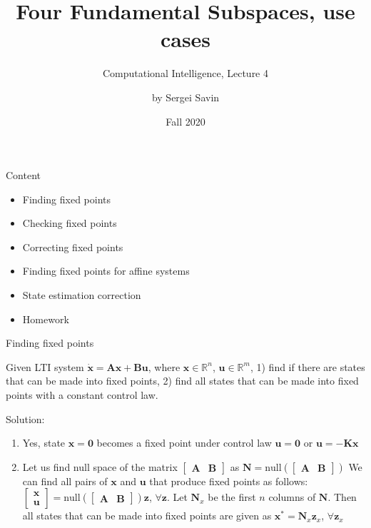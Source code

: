 \documentclass{beamer}
\title{Four Fundamental Subspaces, use cases}
\subtitle{Computational Intelligence, Lecture 4}
\author{by Sergei Savin}
\date{Fall 2020}
\begin{document}
\maketitle


\begin{frame}{Content}

\begin{itemize}
\item Finding fixed points
\item Checking fixed points
\item Correcting fixed points
\item Finding fixed points for affine systems
\item State estimation correction
\item Homework
\end{itemize}

\end{frame}



\begin{frame}{Finding fixed points}
\begin{flushleft}

Given LTI system $\dot{\mathbf{x}} = \mathbf{A} \mathbf{x} + \mathbf{B} \mathbf{u}$, where $\mathbf{x} \in \mathbb{R}^n$, $\mathbf{u} \in \mathbb{R}^m$, 1) find if there are states that can be made into fixed points, 2) find all states that can be made into fixed points with a constant control law.

\bigskip

Solution: 

\begin{enumerate}
    \item Yes, state $\mathbf{x} = \mathbf{0}$ becomes a fixed point under control law $\mathbf{u} = \mathbf{0}$ or $\mathbf{u} = -\mathbf{K}\mathbf{x}$
    \item Let us find null space of the matrix $\begin{bmatrix} \mathbf{A} & \mathbf{B} \end{bmatrix}$ as $\mathbf{N} = \text{null} (\begin{bmatrix} \mathbf{A} & \mathbf{B} \end{bmatrix})$ We can find all pairs of $\mathbf{x}$ and $\mathbf{u}$ that produce fixed points as follows: $\begin{bmatrix} \mathbf{x} \\ \mathbf{u} \end{bmatrix} = \text{null} (\begin{bmatrix} \mathbf{A} & \mathbf{B} \end{bmatrix}) \mathbf{z}$, $\forall \mathbf{z}$. Let $\mathbf{N}_x$ be the first $n$ columns of $\mathbf{N}$. Then all states that can be made into fixed points are given as $\mathbf{x}^* = \mathbf{N}_x \mathbf{z}_x$, $\forall \mathbf{z}_x$
\end{enumerate}

\end{flushleft}
\end{frame}
\end{document}
